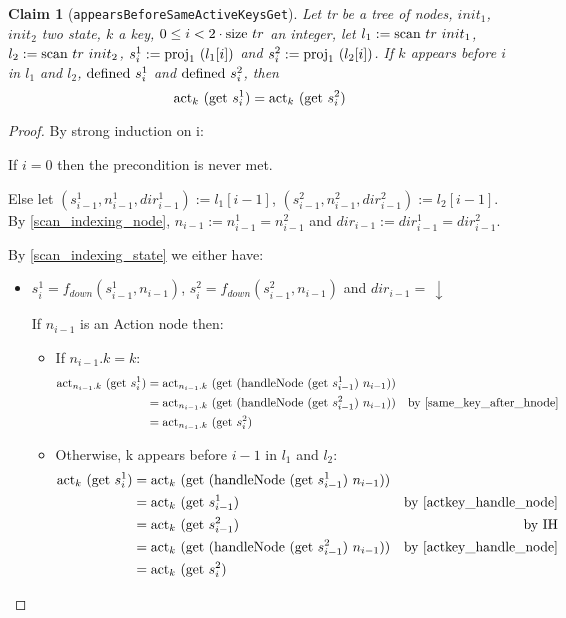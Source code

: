 \documentclass{article}
\newtheorem{claim}[lemma]{Claim}
\newcommand{\textfun}[1]{\textup{#1}}
\newcommand{\textcode}[1]{\texttt{#1}}
\newcommand{\fdown}[2]{\ensuremath{f_{down}(#1, #2)}}
\newcommand{\scan}[2]{\textfun{scan}\ #1\ #2}
\newcommand{\down}{\downarrow}
\newcommand{\hNode}[2]{\textfun{handleNode}\ #1\ #2}
\newcommand{\defined}[1]{\textfun{defined}\ #1}
\newcommand{\get}[1]{\textfun{get}\ #1}
\newcommand{\size}[1]{\textfun{size}\ #1}
\newcommand{\fst}[1]{\textfun{proj}_1\ #1}
\newcommand{\actkey}[2]{\textfun{act}_{#1}\ #2}
\begin{document}
\begin{claim}[\textcode{appearsBeforeSameActiveKeysGet}]
    \label{actkey_after_appear}
    Let tr be a tree of nodes, $init_1$, $init_2$ two state, $k$ a key, $0 \leq i < 2\cdot \size{tr}$ an integer, 
    let $l_1 := \scan{tr}{init_1}$, $l_2 := \scan{tr}{init_2}$, $s^1_i := \fst{(l_1[i])}$ and $s^2_i := \fst{(l_2[i])}$. 
    If $k$ appears before $i$ in $l_1$ and $l_2$, $\defined{s^1_i}$ and $\defined{s^2_i}$, then 
    \[\actkey{k}{(\get{s^1_i})} = \actkey{k}{(\get{s^2_i})}\]
\end{claim}
\begin{proof}
    By strong induction on i:

    If $i = 0$ then the precondition is never met.

    Else let $(s^1_{i -1}, n^1_{i - 1}, dir^1_{i - 1}) := l_1[i - 1]$, $(s^2_{i -1}, n^2_{i - 1}, dir^2_{i - 1}) := l_2[i - 1]$.
    By \cref{scan_indexing_node}, $n_{i - 1} := n^1_{i - 1} = n^2_{i - 1}$ and $dir_{i - 1} := dir^1_{i - 1} = dir^2_{i - 1}$.

    By \cref{scan_indexing_state} we either have:
    \begin{itemize}
        \item $s^1_i = \fdown{s^1_{i - 1}}{n_{i - 1}}$, $s^2_i = \fdown{s^2_{i - 1}}{n_{i - 1}}$ and $dir_{i - 1} =\, \down$ 
        
            If $n_{i - 1}$ is an Action node then:
            \begin{itemize}
                \item If $n_{i - 1}.k = k$:
                \begin{align*}
                    \actkey{n_{i - 1}.k}{(\get{s^1_i})} &= \actkey{n_{i - 1}.k}{(\get{(\hNode{(\get{s^1_{i - 1}})}{n_{i - 1}})})} \\
                     &= \actkey{n_{i - 1}.k}{(\get{(\hNode{(\get{s^2_{i - 1}})}{n_{i - 1}})})} & \text{by \cref{same_key_after_hnode}}\\
                     &= \actkey{n_{i - 1}.k}{(\get{s^2_{i}})} \\
                \end{align*}
                \item Otherwise, k appears before $i - 1$ in $l_1$ and $l_2$:
                \begin{align*}
                    \actkey{k}{(\get{s^1_i})} &= \actkey{k}{(\get{(\hNode{(\get{s^1_{i - 1}})}{n_{i - 1}})})} \\
                    &= \actkey{k}{(\get{s^1_{i - 1}})} &\text{by \cref{actkey_handle_node}} \\
                    &= \actkey{k}{(\get{s^2_{i - 1}})} &\text{by IH} \\
                    &= \actkey{k}{(\get{(\hNode{(\get{s^2_{i - 1}})}{n_{i - 1}})})} &\text{by \cref{actkey_handle_node}} \\
                    &= \actkey{k}{(\get{s^2_i})}
                \end{align*}
            \end{itemize}


\end{itemize}
\end{proof}
\end{document}

